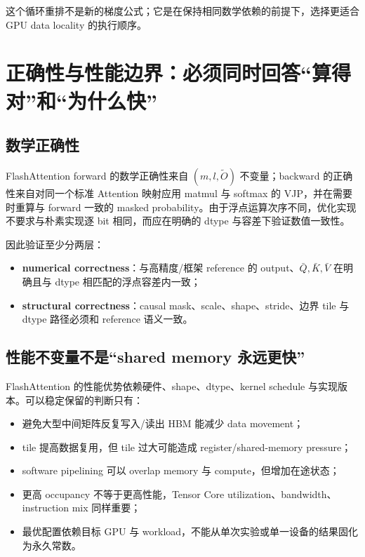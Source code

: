 \documentclass[profile=standard,twoside=false]{ipara-handbook}
\begin{document}
\begin{handbookdiagram}
\centering

\end{handbookdiagram}

这个循环重排不是新的梯度公式；它是在保持相同数学依赖的前提下，选择更适合 GPU data locality 的执行顺序。

\section{正确性与性能边界：必须同时回答“算得对”和“为什么快”}

\subsection{数学正确性}

FlashAttention forward 的数学正确性来自 $(m,l,\widetilde O)$ 不变量；backward 的正确性来自对同一个标准 Attention 映射应用 matmul 与 softmax 的 VJP，并在需要时重算与 forward 一致的 masked probability。由于浮点运算次序不同，优化实现不要求与朴素实现逐 bit 相同，而应在明确的 dtype 与容差下验证数值一致性。

因此验证至少分两层：

\begin{itemize}
  \item \textbf{numerical correctness}：与高精度/框架 reference 的 output、$\bar Q,\bar K,\bar V$ 在明确且与 dtype 相匹配的浮点容差内一致；
  \item \textbf{structural correctness}：causal mask、scale、shape、stride、边界 tile 与 dtype 路径必须和 reference 语义一致。
\end{itemize}

\subsection{性能不变量不是“shared memory 永远更快”}

FlashAttention 的性能优势依赖硬件、shape、dtype、kernel schedule 与实现版本。可以稳定保留的判断只有：

\begin{itemize}
  \item 避免大型中间矩阵反复写入/读出 HBM 能减少 data movement；
  \item tile 提高数据复用，但 tile 过大可能造成 register/shared-memory pressure；
  \item software pipelining 可以 overlap memory 与 compute，但增加在途状态；
  \item 更高 occupancy 不等于更高性能，Tensor Core utilization、bandwidth、instruction mix 同样重要；
  \item 最优配置依赖目标 GPU 与 workload，不能从单次实验或单一设备的结果固化为永久常数。
\end{itemize}
\end{document}
